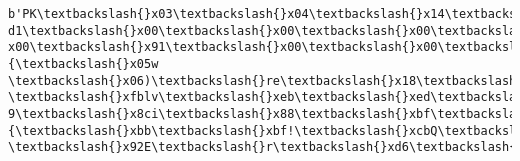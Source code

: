 \documentclass[11pt]{article}
\begin{document}
    \begin{Verbatim}[commandchars=\\\{\}]
b'PK\textbackslash{}x03\textbackslash{}x04\textbackslash{}x14\textbackslash{}x00\textbackslash{}x00\textbackslash{}x00\textbackslash{}x08\textbackslash{}x00\textbackslash{}x00\textbackslash{}x00!\textbackslash{}x00\textbackslash{}x96\textbackslash{}xd7l\textbackslash{}x00\textbackslash{}x91\textbackslash{}x00\textbackslash{}x00\textbackslash{}x00\textbackslash{}x
d1\textbackslash{}x00\textbackslash{}x00\textbackslash{}x00\textbackslash{}x05\textbackslash{}x00\textbackslash{}x14\textbackslash{}x00S.npy\textbackslash{}x01\textbackslash{}x00\textbackslash{}x10\textbackslash{}x00\textbackslash{}xd1\textbackslash{}x00\textbackslash{}x00\textbackslash{}x00\textbackslash{}x00\textbackslash{}x00\textbackslash{}x00\textbackslash{}
x00\textbackslash{}x91\textbackslash{}x00\textbackslash{}x00\textbackslash{}x00\textbackslash{}x00\textbackslash{}x00\textbackslash{}x00\textbackslash{}x00\textbackslash{}x9d\textbackslash{}x89\textbackslash{}xbb\textbackslash{}r\textbackslash{}xc20\textbackslash{}x14\textbackslash{}x00\textbackslash{}x9f\_\textbackslash{}xe2O\^{}b\{\textbackslash{}x05w
\textbackslash{}x06)\textbackslash{}re\textbackslash{}x18\textbackslash{}x80\textbackslash{}x0eDCA\textbackslash{}x85\textbackslash{}xac\textbackslash{}xc4\textbackslash{}x88\textbackslash{}x02\textbackslash{}x11\textbackslash{}xe4\textbackslash{}x00\textbackslash{}r0\textbackslash{}x05\textbackslash{}x0bcV\textbackslash{}xe0\textbackslash{}xba\textbackslash{}xbb
\textbackslash{}xfblv\textbackslash{}xeb\textbackslash{}xed\textbackslash{}x9e\textbackslash{}xc1\textbackslash{}x03\textbackslash{}x9e\textasciitilde{}\textbackslash{}x88S\textbackslash{}x9f\textbackslash{}xfc\textbackslash{}xd2\textbackslash{}xf9\textbackslash{}xd7\}\textbackslash{}xe1[\textbackslash{}xe7\textbackslash{}x8fc\textbackslash{}xba\textbackslash{}xa5p
9\textbackslash{}x8ci\textbackslash{}x88\textbackslash{}xbf\textbackslash{}xbe\textbackslash{}n\textbackslash{}xe7)\textbackslash{}xe6>\textbackslash{}x9d\textbackslash{}xc25f\textbackslash{}x9fu\textbackslash{}xad\textbackslash{}xeb\textbackslash{}xe6\textbackslash{}xad\{\textbackslash{}xbb\textbackslash{}xbf!\textbackslash{}xcbQ\textbackslash{}n!*
\textbackslash{}x92E\textbackslash{}r\textbackslash{}xd6\textbackslash{}x94\textbackslash{}xac\textbackslash{}xa9I\textbackslash{}x03\textbackslash{}xaa\textbackslash{}n\textbackslash{}t\textbackslash{}x8d1\textbackslash{}x8d\textbackslash{}x00\textbackslash{}xcexi\%\textbackslash{}xe4!I\textbackslash{}x11\textbackslash{}xa3\textbackslash{}x92j(\textbackslash{}x14

\end{Verbatim}
\end{document}
